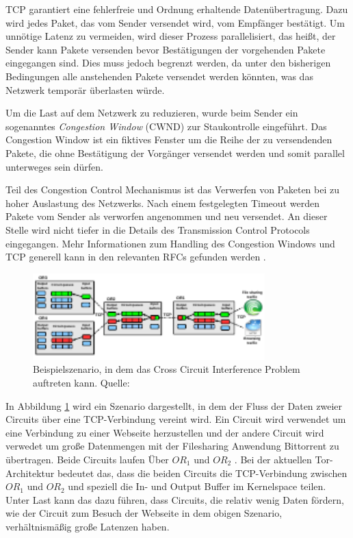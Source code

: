 \documentclass[fleqn,envcountsame,runningheads,10pt,a4paper]{llncs}
\begin{document}
TCP garantiert eine fehlerfreie und Ordnung erhaltende Datenübertragung. Dazu 
wird jedes Paket, das vom Sender versendet wird, vom Empfänger bestätigt. Um 
unnötige Latenz zu vermeiden, wird dieser Prozess parallelisiert, das heißt, der 
Sender kann Pakete versenden bevor Bestätigungen der vorgehenden Pakete 
eingegangen sind. Dies muss jedoch begrenzt werden, da unter den bisherigen 
Bedingungen alle anstehenden Pakete versendet werden könnten, was das Netzwerk 
temporär überlasten würde.

Um die Last auf dem Netzwerk zu reduzieren, wurde beim Sender ein sogenanntes 
\textit{Congestion Window} (CWND) zur Staukontrolle eingeführt. Das Congestion 
Window ist ein fiktives Fenster um die Reihe der zu versendenden Pakete, die 
ohne Bestätigung der Vorgänger versendet werden und somit parallel unterweges 
sein dürfen.

Teil des Congestion Control Mechanismus ist das Verwerfen von Paketen bei zu 
hoher Auslastung des Netzwerks. Nach einem festgelegten Timeout werden Pakete 
vom Sender als verworfen angenommen und neu versendet. An dieser Stelle wird 
nicht tiefer in die Details des Transmission Control Protocols eingegangen. Mehr 
Informationen zum Handling des Congestion Windows und TCP generell kann in den 
relevanten RFCs gefunden werden \cite{rfc:tcp, rfc:tcpcc}.

\begin{figure}[h]
  \begin{center}
    \includegraphics[width=0.8\textwidth]{pics/BufferPic.pdf}
    \caption{Beispielszenario, in dem das Cross Circuit Interference Problem auftreten kann. Quelle: \cite{pctcp} }
    \label{fig:buffer} 
  \end{center} 
\end{figure} 

In Abbildung \ref{fig:buffer} wird ein Szenario dargestellt, in dem der Fluss 
der Daten zweier Circuits über eine TCP-Verbindung vereint wird. Ein Circuit 
wird verwendet um eine Verbindung zu einer Webseite herzustellen und der andere 
Circuit wird verwedet um große Datenmengen mit der Filesharing Anwendung 
Bittorrent zu übertragen. Beide Circuits laufen Über $\textit{OR}_1$ und 
$\textit{OR}_2$ . Bei der aktuellen Tor-Architektur bedeutet das, dass die 
beiden Circuits die TCP-Verbindung zwischen $\textit{OR}_1$ und $\textit{OR}_2$ 
und speziell die In- und Output Buffer im Kernelspace teilen. Unter Last kann das 
dazu führen, dass Circuits, die relativ wenig Daten fördern, wie der Circuit zum 
Besuch der Webseite in dem obigen Szenario, verhältnismäßig große Latenzen 
haben.
\end{document}
